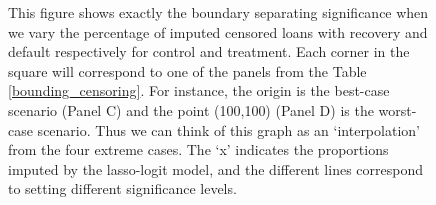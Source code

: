 \begin{figure}[H]
     This figure shows exactly the boundary separating significance when we vary the percentage of imputed censored loans with recovery and default respectively for control and treatment. Each corner in the square will correspond to one of the panels from the Table \ref{bounding_censoring}. For instance, the origin is the best-case scenario (Panel C) and the point (100,100) (Panel D) is the worst-case scenario. Thus we can think of this graph as an `interpolation' from the four extreme cases. The `x' indicates the proportions imputed by the lasso-logit model, and the different lines correspond to setting different significance levels. 

\end{figure}





